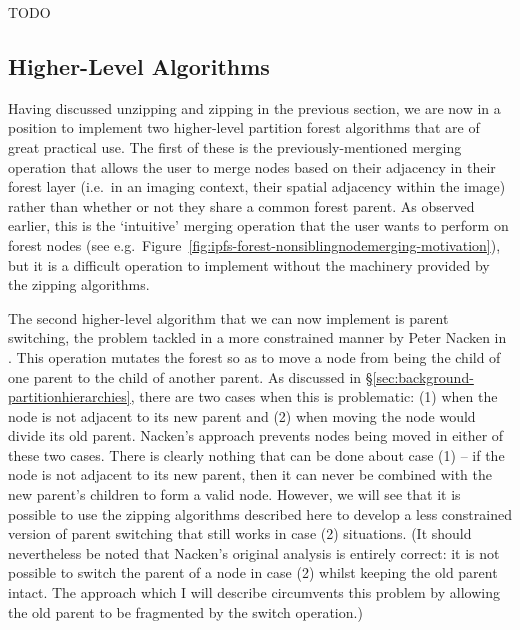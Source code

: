 TODO

\afterpage{\clearpage}
\newpage

\subsection{Higher-Level Algorithms}

Having discussed unzipping and zipping in the previous section, we are now in a position to implement two higher-level partition forest algorithms that are of great practical use. The first of these is the previously-mentioned merging operation that allows the user to merge nodes based on their adjacency in their forest layer (i.e.~in an imaging context, their spatial adjacency within the image) rather than whether or not they share a common forest parent. As observed earlier, this is the `intuitive' merging operation that the user wants to perform on forest nodes (see e.g.~Figure~\ref{fig:ipfs-forest-nonsiblingnodemerging-motivation}), but it is a difficult operation to implement without the machinery provided by the zipping algorithms.

The second higher-level algorithm that we can now implement is parent switching, the problem tackled in a more constrained manner by Peter Nacken in \cite{nacken95}. This operation mutates the forest so as to move a node from being the child of one parent to the child of another parent. As discussed in \S\ref{sec:background-partitionhierarchies}, there are two cases when this is problematic: (1) when the node is not adjacent to its new parent and (2) when moving the node would divide its old parent. Nacken's approach prevents nodes being moved in either of these two cases. There is clearly nothing that can be done about case (1) -- if the node is not adjacent to its new parent, then it can never be combined with the new parent's children to form a valid node. However, we will see that it is possible to use the zipping algorithms described here to develop a less constrained version of parent switching that still works in case (2) situations. (It should nevertheless be noted that Nacken's original analysis is entirely correct: it is not possible to switch the parent of a node in case (2) whilst keeping the old parent intact. The approach which I will describe circumvents this problem by allowing the old parent to be fragmented by the switch operation.)

\newpage

